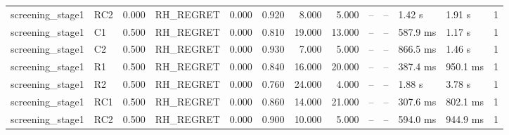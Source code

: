 \begin{table}
{\begin{tabular}{llrlrrrrrrllr}
screening\_stage1 & RC2 & 0.000 & RH\_REGRET & 0.000 & 0.920 & 8.000 & 5.000 & -- & -- & 1.42 s & 1.91 s & 1 \\
screening\_stage1 & C1 & 0.500 & RH\_REGRET & 0.000 & 0.810 & 19.000 & 13.000 & -- & -- & 587.9 ms & 1.17 s & 1 \\
screening\_stage1 & C2 & 0.500 & RH\_REGRET & 0.000 & 0.930 & 7.000 & 5.000 & -- & -- & 866.5 ms & 1.46 s & 1 \\
screening\_stage1 & R1 & 0.500 & RH\_REGRET & 0.000 & 0.840 & 16.000 & 20.000 & -- & -- & 387.4 ms & 950.1 ms & 1 \\
screening\_stage1 & R2 & 0.500 & RH\_REGRET & 0.000 & 0.760 & 24.000 & 4.000 & -- & -- & 1.88 s & 3.78 s & 1 \\
screening\_stage1 & RC1 & 0.500 & RH\_REGRET & 0.000 & 0.860 & 14.000 & 21.000 & -- & -- & 307.6 ms & 802.1 ms & 1 \\
screening\_stage1 & RC2 & 0.500 & RH\_REGRET & 0.000 & 0.900 & 10.000 & 5.000 & -- & -- & 594.0 ms & 944.9 ms & 1 \\
\bottomrule
\end{tabular}
}
\end{table}
